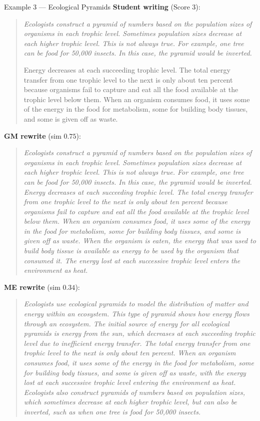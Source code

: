 \begin{examplebox}{Example 3 --- Ecological Pyramids}
\textbf{Student writing} (Score 3):

\begin{quote}\itshape
Ecologists construct a pyramid of numbers based on the population sizes of organisms in each trophic level. Sometimes population sizes decrease at each higher trophic level. This is not always true. For example, one tree can be food for 50,000 insects. In this case, the pyramid would be inverted.

Energy decreases at each succeeding trophic level. The total energy transfer from one trophic level to the next is only about ten percent because organisms fail to capture and eat all the food available at the trophic level below them. When an organism consumes food, it uses some of the energy in the food for metabolism, some for building body tissues, and some is given off as waste.
\end{quote}

\textbf{GM rewrite} (sim $0.75$):

\begin{quote}\itshape
Ecologists construct a pyramid of numbers based on the population sizes of organisms in each trophic level. Sometimes population sizes decrease at each higher trophic level. This is not always true. For example, one tree can be food for 50,000 insects. In this case, the pyramid would be inverted. Energy decreases at each succeeding trophic level. The total energy transfer from one trophic level to the next is only about ten percent because organisms fail to capture and eat all the food available at the trophic level below them. When an organism consumes food, it uses some of the energy in the food for metabolism, some for building body tissues, and some is given off as waste. When the organism is eaten, the energy that was used to build body tissue is available as energy to be used by the organism that consumed it. The energy lost at each successive trophic level enters the environment as heat.
\end{quote}

\textbf{ME rewrite} (sim $0.34$):

\begin{quote}\itshape
Ecologists use ecological pyramids to model the distribution of matter and energy within an ecosystem. This type of pyramid shows how energy flows through an ecosystem. The initial source of energy for all ecological pyramids is energy from the sun, which decreases at each succeeding trophic level due to inefficient energy transfer. The total energy transfer from one trophic level to the next is only about ten percent. When an organism consumes food, it uses some of the energy in the food for metabolism, some for building body tissues, and some is given off as waste, with the energy lost at each successive trophic level entering the environment as heat. Ecologists also construct pyramids of numbers based on population sizes, which sometimes decrease at each higher trophic level, but can also be inverted, such as when one tree is food for 50,000 insects.
\end{quote}
\end{examplebox}
